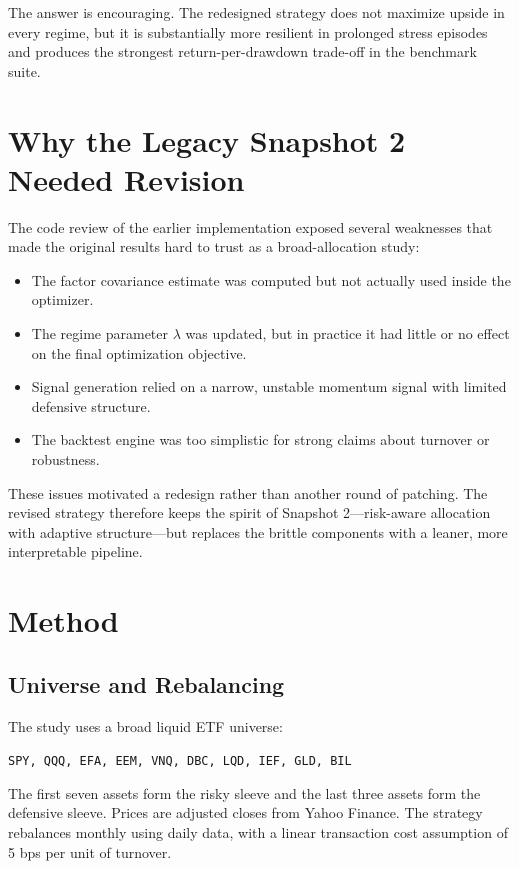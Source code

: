 \documentclass[11pt]{article}
\begin{document}
The answer is encouraging. The redesigned strategy does not maximize upside in every regime, but it is substantially more resilient in prolonged stress episodes and produces the strongest return-per-drawdown trade-off in the benchmark suite.

\section{Why the Legacy Snapshot 2 Needed Revision}

The code review of the earlier implementation exposed several weaknesses that made the original results hard to trust as a broad-allocation study:

\begin{itemize}
    \item The factor covariance estimate was computed but not actually used inside the optimizer.
    \item The regime parameter $\lambda$ was updated, but in practice it had little or no effect on the final optimization objective.
    \item Signal generation relied on a narrow, unstable momentum signal with limited defensive structure.
    \item The backtest engine was too simplistic for strong claims about turnover or robustness.
\end{itemize}

These issues motivated a redesign rather than another round of patching. The revised strategy therefore keeps the spirit of Snapshot 2---risk-aware allocation with adaptive structure---but replaces the brittle components with a leaner, more interpretable pipeline.

\section{Method}

\subsection{Universe and Rebalancing}

The study uses a broad liquid ETF universe:

\begin{center}
\texttt{SPY, QQQ, EFA, EEM, VNQ, DBC, LQD, IEF, GLD, BIL}
\end{center}

The first seven assets form the risky sleeve and the last three assets form the defensive sleeve. Prices are adjusted closes from Yahoo Finance. The strategy rebalances monthly using daily data, with a linear transaction cost assumption of 5 bps per unit of turnover.
\end{document}
